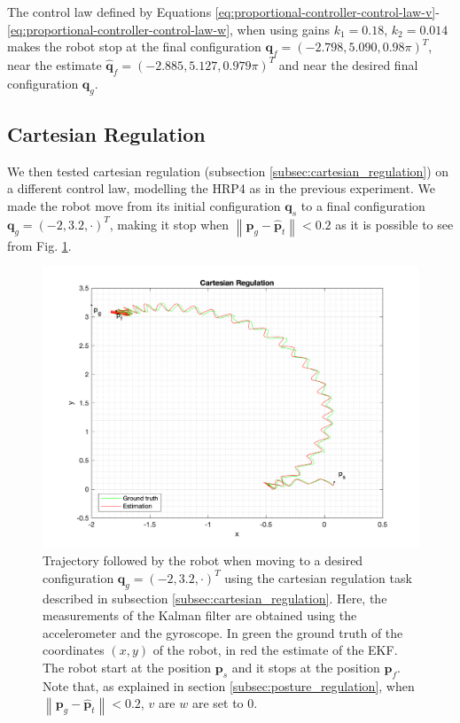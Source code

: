 \documentclass[a4paper]{article}
\begin{document}
The control law defined by Equations
\ref{eq:proportional-controller-control-law-v}-\ref{eq:proportional-controller-control-law-w},
when using gains $k_1=0.18$, $k_2=0.014$ makes the robot stop at the final
configuration $\bm{q}_f = (-2.798, 5.090, 0.98\pi)^T$, near the estimate
$\bm{\hat{q}}_f = (-2.885, 5.127, 0.979\pi)^T$ and
near the desired final configuration $\bm{q}_g$.

\subsection{Cartesian Regulation}
We then tested cartesian regulation (subsection \ref{subsec:cartesian_regulation})
on a different control law, modelling the HRP4 as in the previous experiment.
We made the robot move from its initial
configuration $\bm{q}_s$ to a final configuration $\bm{q}_g = (-2, 3.2, \cdot)^T$,
making it stop when $\left\|\bm{p}_g - \bm{\hat{p}}_t \right\| < 0.2$ as it is
possible to see from Fig. \ref{fig:cartesian_regulation_xy}.
\begin{figure}
    \centering
    \includegraphics[width=\textwidth]{images/cartesian_regulation.png}
    \caption{Trajectory followed by the robot when moving to a desired configuration
        $\bm{q}_g = (-2, 3.2, \cdot)^T$ using the cartesian regulation task
        described in subsection \ref{subsec:cartesian_regulation}.
        Here, the measurements of the Kalman filter are obtained
        using the accelerometer and the gyroscope. In green the ground truth of the coordinates $(x, y)$ of the
        robot, in red the estimate of the EKF. The robot start at the
        position $\bm{p}_s$ and it stops at the position $\bm{p}_f$. Note that,
        as explained in section \ref{subsec:posture_regulation},
        when $\left\|\bm{p}_g - \bm{\hat{p}}_t \right\| < 0.2$, $v$ are $w$ are set to 0.}
    \label{fig:cartesian_regulation_xy}
\end{figure}
\end{document}
